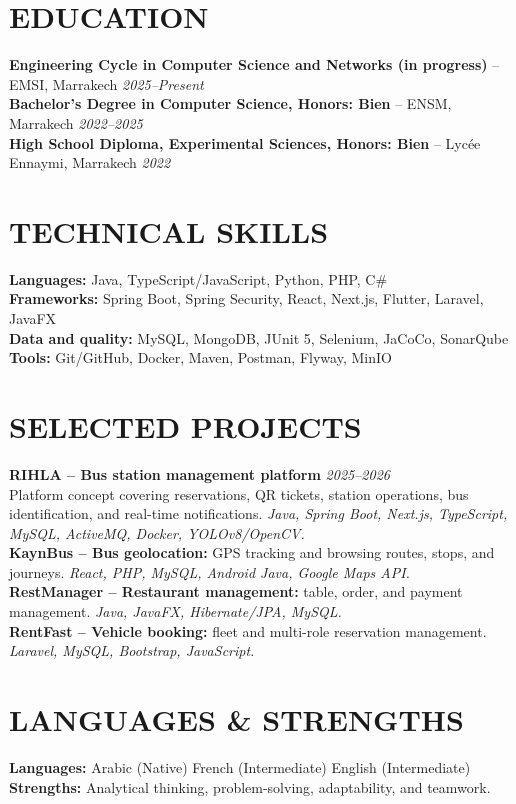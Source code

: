 \documentclass[a4paper,11pt]{article}
\begin{document}
\section{EDUCATION}
\textbf{Engineering Cycle in Computer Science and Networks (in progress)} -- EMSI, Marrakech \hfill \textit{2025--Present}\\
\textbf{Bachelor's Degree in Computer Science, Honors: Bien} -- ENSM, Marrakech \hfill \textit{2022--2025}\\
\textbf{High School Diploma, Experimental Sciences, Honors: Bien} -- Lyc\'ee Ennaymi, Marrakech \hfill \textit{2022}

\section{TECHNICAL SKILLS}
\textbf{Languages:} Java, TypeScript/JavaScript, Python, PHP, C\# \\
\textbf{Frameworks:} Spring Boot, Spring Security, React, Next.js, Flutter, Laravel, JavaFX \\
\textbf{Data and quality:} MySQL, MongoDB, JUnit 5, Selenium, JaCoCo, SonarQube \\
\textbf{Tools:} Git/GitHub, Docker, Maven, Postman, Flyway, MinIO

\section{SELECTED PROJECTS}
\textbf{RIHLA -- Bus station management platform} \hfill \textit{2025--2026}\\[-0.1em]
Platform concept covering reservations, QR tickets, station operations, bus identification, and real-time notifications. \textit{Java, Spring Boot, Next.js, TypeScript, MySQL, ActiveMQ, Docker, YOLOv8/OpenCV.}\\[0.15em]
\textbf{KaynBus -- Bus geolocation:} GPS tracking and browsing routes, stops, and journeys. \textit{React, PHP, MySQL, Android Java, Google Maps API.}\\[0.15em]
\textbf{RestManager -- Restaurant management:} table, order, and payment management. \textit{Java, JavaFX, Hibernate/JPA, MySQL.}\\[0.15em]
\textbf{RentFast -- Vehicle booking:} fleet and multi-role reservation management. \textit{Laravel, MySQL, Bootstrap, JavaScript.}

\section{LANGUAGES \& STRENGTHS}
\textbf{Languages:} Arabic (Native) \textbar{} French (Intermediate) \textbar{} English (Intermediate)\\
\textbf{Strengths:} Analytical thinking, problem-solving, adaptability, and teamwork.
\end{document}
